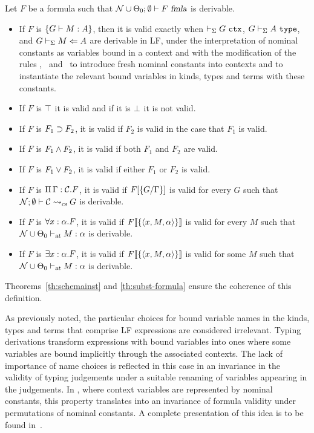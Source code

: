 \begin{definition}\label{def:semantics}
Let $F$ be a formula such that $\wfform{\noms \cup
  \STLCGamma_0}{\emptyset}{F}$ is derivable. 
%
\begin{itemize}
\item If $F$ is $\fatm{G}{M:A}$, then it is valid exactly when $\lfctx{G}$,
  $\lftype{G}{A}$, and $\lfchecktype{G}{M}{A}$ are derivable in LF,
  under the interpretation of nominal constants as variables bound in
  a context and with the modification of the rules \canonkindpi, \canonfampi\ and
  \canontermlam\ to introduce fresh nominal constants into contexts and to
  instantiate the relevant bound variables in kinds, types and terms with
  these constants.

\item If $F$ is $\ftrue$ it is valid and if it is $\ffalse$ it is not valid.

\item If $F$ is $\fimp{F_1}{F_2}$, it is valid if $F_2$ is valid in
  the case that $F_1$ is valid.

\item If $F$ is $\fand{F_1}{F_2}$, it is valid if both $F_1$ and
  $F_2$ are valid.

\item If $F$ is $\myfor{F_1}{F_2}$, it is valid if either $F_1$ or $F_2$ is valid.

\item If $F$ is $\fctx{\Gamma}{\mathcal{C}}{F}$, it is valid if
  $\subst{\{G/\Gamma\}}{F}$ is valid for every $G$ such that
  $\csinst{\noms}{\emptyset}{\mathcal{C}}{G}$ is derivable.

\item If $F$ is $\fall{x:\alpha}{F}$, it is valid if
  $\hsubst{\{\langle x, M,\alpha\rangle \}}{F}$ is valid for every $M$ such that
  $\stlctyjudg{\noms \cup \STLCGamma_0}{M}{\alpha}$ is derivable.

\item If $F$ is $\fexists{x:\alpha}{F}$, it is valid if
  $\hsubst{\{\langle x, M,\alpha\rangle \}}{F}$ is valid for some $M$ such that 
  $\stlctyjudg{\noms \cup \STLCGamma_0}{M}{\alpha}$ is derivable.
\end{itemize}
\end{definition}

Theorems~\ref{th:schemainst} and \ref{th:subst-formula} ensure the
coherence of this definition. 

As previously noted, the particular choices for bound variable names
in the kinds, types and terms that comprise LF expressions are
considered irrelevant. 
%
Typing derivations transform expressions with bound variables into
ones where some variables are bound implicitly through
the associated contexts.
%
The lack of importance of name choices is reflected in this case in an
invariance in the validity of typing judgements under a suitable
renaming of variables appearing in the judgements.
%
In \logic, where context variables are represented by nominal
constants, this property translates into an invariance of formula
validity under permutations of nominal constants. 
%
A complete presentation of this idea is to be found
in~\cite{nadathur21arxiv}. 


